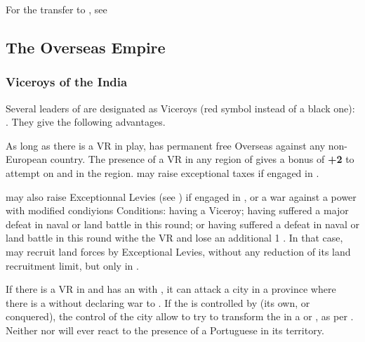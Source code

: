\aparag For the transfer to , see

\subsection{The Overseas Empire}
\subsubsection{Viceroys of the India}\label{chSpecific:Portugal:Viceroys}
\aparag Several leaders of \POR are designated as Viceroys (red symbol
instead of a black one): .
They give \POR the following advantages.

\bparag As long as there is a VR in play, \POR has permanent free
Overseas \CB against any non-European country.
\bparag The presence of a VR in any region of \ROTW gives a bonus of
{\bf +2} to \CONC attempt on \TP and \COL in the region.
\aparag \POR may raise exceptional taxes if engaged in .

\aparag \POR may also raise Exceptionnal Levies (see
) if engaged in , or a war against a \ROTW power with modified condiyions
\bparag Conditions: having a Viceroy; having suffered a major defeat in
naval or land battle in \ROTW this round; or having suffered a defeat in
naval or land battle in \ROTW this round withe the VR and lose an
additional 1 \STAB.
\bparag In that case, \POR may recruit land forces by Exceptional
Levies, without any reduction of its land recruitment limit, but only in
\ROTW.

\label{chSpecific:Portugal:Goa Colony}
\bparag If there is a VR in  and \POR has an \dipAT
with , it can attack a city in a province where there
is a \TP without declaring war to .
\bparag If the \TP is controlled by \POR (its own, or conquered), the
control of the city allow \POR to try to transform the \TP in a \COL or
\POR, as per .
\bparag Neither  nor  will ever react to
the presence of a Portuguese \COL in its territory.

